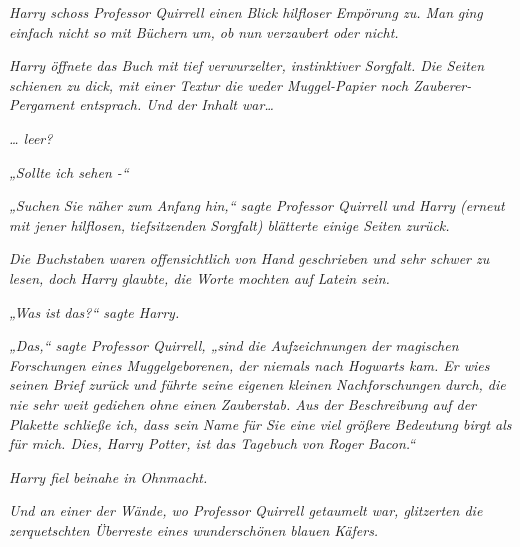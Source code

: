 {\emph{Harry schoss Professor Quirrell einen Blick hilfloser Empörung zu. Man} \emph{\emph{ging}} \emph{einfach nicht} \emph{so} \emph{mit Büchern} \emph{um, ob} \emph{nun} \emph{verzaubert oder nicht.}

\emph{Harry öffnete das Buch mit} \emph{tief verwurzelter, instinktiver Sorgfalt. Die Seiten schienen zu dick, mit einer Textur die weder Muggel-Papier noch Zauberer-Pergament entsprach. Und der Inhalt war…}

\emph{… leer?}

\emph{„Sollte ich sehen -“}

\emph{„Suchen} \emph{Sie näher zum Anfang hin,“ sagte Professor Quirrell und Harry (erneut mit jener hilflosen,} \emph{tiefsitzenden} \emph{Sorgfalt) blätterte einige Seiten zurück.}

\emph{Die Buchstaben waren offensichtlich} \emph{von Hand geschrieben und sehr schwer zu lesen, doch Harry glaubte, die Worte mochten auf Latein sein.}

\emph{„Was} \emph{\emph{ist}} \emph{das?“ sagte Harry.}

\emph{„Das,“ sagte Professor Quirrell, „sind die Aufzeichnungen der magischen Forschungen eines Muggelgeborenen, der niemals nach Hogwarts kam. Er wies seinen Brief zurück und führte seine eigenen kleinen Nachforschungen durch, die nie sehr weit gediehen ohne einen Zauberstab. Aus der Beschreibung auf der Plakette schließe ich, dass sein Name für Sie eine viel größere Bedeutung birgt als für mich. Dies, Harry Potter, ist das Tagebuch von Roger Bacon.“}

\emph{Harry fiel beinahe in Ohnmacht.}

\emph{Und an einer der Wände, wo Professor Quirrell getaumelt war, glitzerten die zerquetschten Überreste eines wunderschönen blauen Käfers.}

}
